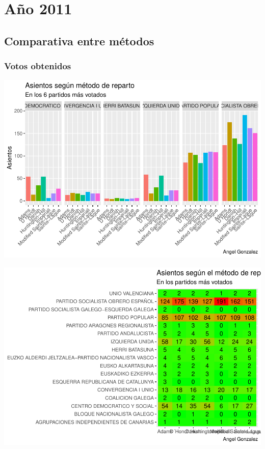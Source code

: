 \documentclass[12pt,a4paper,]{book}
\numberwithin{dummy}{section}
\theoremstyle{ocrenumbox}
\theoremstyle{blacknumex}
\theoremstyle{blacknumbox}
\theoremstyle{ocrenum}
\theoremstyle{ocrenum}
\begin{document}
\hypertarget{auxf1o-2011}{%
\section{Año 2011}\label{auxf1o-2011}}

\hypertarget{comparativa-entre-muxe9todos-10}{%
\subsection{Comparativa entre
métodos}\label{comparativa-entre-muxe9todos-10}}

\hypertarget{votos-obtenidos-10}{%
\subsubsection{Votos obtenidos}\label{votos-obtenidos-10}}

\begin{center}\includegraphics[width=0.95\linewidth]{figurasR/unnamed-chunk-101-1} \end{center}

\begin{center}\includegraphics[width=0.95\linewidth]{figurasR/unnamed-chunk-101-2} \end{center}
\end{document}

